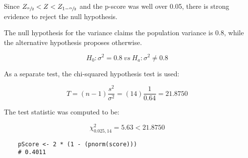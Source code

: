     Since $Z_{\sfrac{\alpha}{2}} < Z < Z_{1-\sfrac{\alpha}{2}}$ and the p-score was well over 0.05, there is strong evidence to reject the null hypothesis.\n

    The null hypothesis for the variance claims the population variance is 0.8, while the alternative hypothesis proposes otherwise.

        \[ H_{0}: \sigma^{2} = 0.8 \ vs \ H_{a}: \sigma^{2} \neq 0.8 \]

    As a separate test, the chi-squared hypothesis test is used:

    \begin{equation*}
        T=(n-1)\frac{s^{2}}{\sigma^{2}}
        =(14)\frac{1}{0.64}=21.8750
    \end{equation*}

    The test statistic was computed to be:

    \begin{equation*}
        {\chi}^{2}_{0.025, 14}= 5.63 < 21.8750
    \end{equation*}


\begin{lstlisting}
    pScore <- 2 * (1 - (pnorm(score)))
    # 0.4011
\end{lstlisting}
